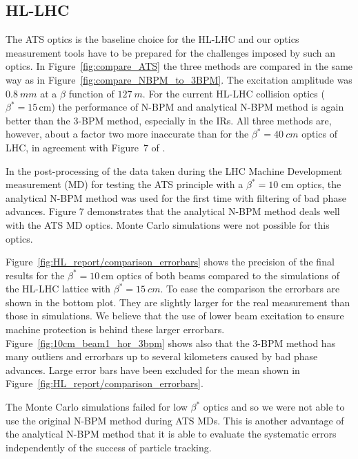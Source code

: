 \subsection{HL-LHC}
The ATS optics \cite{Fartoukh:2013jna} is the baseline choice for the HL-LHC and our optics measurement tools have to be prepared for the challenges imposed by such an optics. In Figure~\ref{fig:compare_ATS} the three methods are compared in the same way as in Figure~\ref{fig:compare_NBPM_to_3BPM}. The excitation amplitude was $ \SI{0.8}{mm} $ at a $ \beta $ function of $ \SI{127}{m} $. For the current HL-LHC collision optics ($ \beta^* =15\,\text{cm}$) the performance of N-BPM and analytical N-BPM method is again better than the 3-BPM method, especially in the IRs. All three methods are, however, about a factor two more inaccurate than for the $ \beta^*=\SI{40}{cm} $ optics of LHC, in agreement with Figure~7 of \cite{nbpm}.

In the post-processing of the data taken during the LHC Machine Development
measurement (MD) \cite{mdpubl} for testing the ATS principle with a $ \beta^* = 10$ cm optics, the analytical N-BPM method was used for the first time with filtering of bad phase advances. Figure 7 demonstrates that the analytical N-BPM
method deals well with the ATS MD optics. Monte Carlo simulations were
not possible for this optics.

Figure~\ref{fig:HL_report/comparison_errorbars} shows the precision of the final results for the $ \beta^*=10\,\text{cm} $ optics of both beams compared to the simulations of the HL-LHC lattice with $ \beta^*=\SI{15}{cm} $. To ease the comparison the errorbars are
shown in the bottom plot. They are slightly larger for the real measurement than those in simulations. We believe that the use of lower beam excitation   to ensure machine protection is behind these larger errorbars. Figure~\ref{fig:10cm_beam1_hor_3bpm} shows also that the 3-BPM method has many outliers and errorbars up to several kilometers caused by bad phase advances. Large error bars have been excluded for the mean shown in Figure~\ref{fig:HL_report/comparison_errorbars}.



The Monte Carlo simulations failed for low $ \beta^* $ optics and so we were not able to use the original N-BPM method during ATS MDs. This is another advantage of the analytical N-BPM method that it is
able to evaluate the systematic errors independently of the success of particle tracking.

